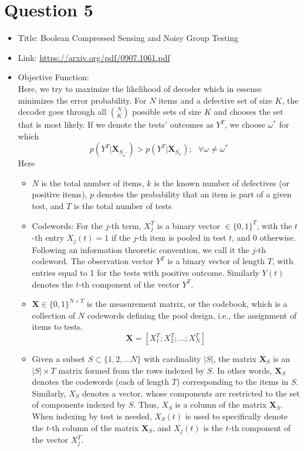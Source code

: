 \documentclass[12pt]{article}
\begin{document}
\section*{Question 5}
\begin{itemize}
\item Title: Boolean Compressed Sensing and
Noisy Group Testing
\item Link: \href{https://arxiv.org/pdf/0907.1061.pdf}{https://arxiv.org/pdf/0907.1061.pdf}
\item Objective Function:\\
Here, we try to maximize the likelihood of decoder which in essense minimizes the error probability. For $N$ items and a defective set of size $K$, the decoder goes through all $N \choose K$ possible sets of size $K$ and chooses the set that is most likely. If we denote the tests' outcomes as $Y^T$, we choose $\omega^*$ for which 
$$p(Y^T | \boldsymbol{X}_{S_{\omega^*}}) > p(Y^T|\boldsymbol{X}_{S_{\omega}}); \:\:\: \forall \omega \neq \omega^* $$
Here
\begin{itemize}
	\item $N$ is the total number of items, $k$ is the known number of defectives (or positive items), $p$ denotes the
	probability that an item is part of a given test, and $T$ is the total number of tests
	\item Codewords: For the $j$-th term, $X_j^T$ is a binary vector $\in \{0,1\}^T$, with the $t$-th entry $X_j(t) = 1$ if the $j$-th item is pooled in test $t$, and 0 otherwise. Following an information theoretic convention, we call it the $j$-th
	codeword. The observation vector $Y^T$ is a binary vector of length $T$, with entries equal to 1 for the tests with positive outcome. Similarly $Y(t)$ denotes the $t$-th component of the vector $Y^T$.
	\item $\boldsymbol{X} \in \{0, 1\}^{N \times T}$ is the measurement matrix, or the codebook, which is a collection of $N$ codewords defining the pool design, i.e., the assignment of items to tests.
	$$\boldsymbol{X} = [X_1^T; X_2^T; \ldots; X_N^T]$$
	\item Given a subset $S \subset \{1, 2, \ldots N\}$ with cardinality $|S|$, the matrix $\boldsymbol{X}_S$ is an $|S|\times T$ matrix formed from the rows indexed by $S$. In other words, $\boldsymbol{X}_S$ denotes the codewords (each of length $T$) corresponding to the items in $S$. Similarly, $X_S$ denotes a vector, whose components are restricted to the set of components indexed by $S$. Thus, $X_S$ is a column of the matrix $\boldsymbol{X}_S$. When indexing by test is needed, $X_S(t)$ is used to specifically denote the $t$-th column of the matrix $\boldsymbol{X}_S$, and $X_j(t)$ is the $t$-th component of the vector $X_j^T$.

\end{itemize}
\end{itemize}
\end{document}

